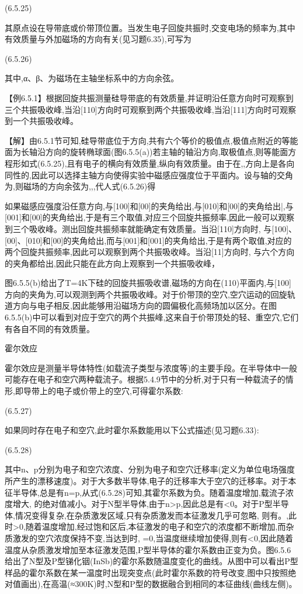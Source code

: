  	(6.5.25)

其原点设在导带底或价带顶位置。当发生电子回旋共振时,交变电场的频率为,其中有效质量与外加磁场的方向有关(见习题6.35),可写为

	 (6.5.26)

其中,α、β、为磁场在主轴坐标系中的方向余弦。

【例6.5.1】根据回旋共振测量硅导带底的有效质量,并证明沿任意方向时可观察到三个共振吸收峰,当沿[110]方向时可观察到两个共振吸收峰,当沿[111]方向时可观察到一个共振吸收峰。

【解】由6.5.1节可知,硅导带底位于方向,共有六个等价的极值点,极值点附近的等能面为长轴沿方向的旋转椭球面(图6.5.5(a))若主轴的轴沿方向,取极值点,则等能面方程形如式(6.5.25),且有电子的横向有效质量,纵向有效质量。由于在,,方向上是各向同性的,因此可以选择主轴方向使得实验中磁感应强度位于平面内。设与轴的交角为,则磁场的方向余弦为,,,代人式(6.5.26)得



如果磁感应强度沿任意方向,与[100]和[00]的夹角给出,与[010]和[00]的夹角给出|,与[001]和[00]的夹角给出,于是有三个取值,对应三个回旋共振频率,因此一般可以观察到三个吸收峰。测出回旋共振频率就能确定有效质量。当沿[110]方向时, 与[100]、[00]、[010]和[00]的夹角给出,而与[001]和[001]的夹角给出,于是有两个取值,对应的两个回旋共振频率,因此可以观察到两个共振吸收峰。当沿[11]方向时, 与六个方向的夹角都给出,因此只能在此方向上观察到一个共振吸收峰，



图6.5.5(b)给出了T=4K下硅的回旋共振吸收谱,磁场的方向在(110)平面内,与[100]方向的夹角为,可以观测到两个共振吸收峰。对于价带顶的空穴,空穴运动的回旋轨道方向与电子相反,因此能够用沿磁场方向的圆偏极化高频场加以区分。在图6.5.5(b)中可以看到对应于空穴的两个共振峰,这来自于价带顶处的轻、重空穴,它们有各自不同的有效质量。

霍尔效应

霍尔效应是测量半导体特性(如载流子类型与浓度等)的主要手段。在半导体中一般可能存在电子和空穴两种载流子。根据5.4.9节中的分析,对于只有一种载流子的情形,即导带上的电子或价带上的空穴,可得霍尔系数:

 	(6.5.27)

如果同时存在电子和空穴,此时霍尔系数能用以下公式描述(见习题6.33):

 	(6.5.28)

其中n、p分别为电子和空穴浓度、分别为电子和空穴迁移率(定义为单位电场强度所产生的漂移速度)。对于大多数半导体,电子的迁移率大于空穴的迁移率。对于本征半导体,总是有n=p,从式(6.5.28)可知,其霍尔系数为负。随着温度增加,载流子浓度增大, 的绝对值减小。对于N型半导体,由于n>p,因此总是有<0。对于P型半导体,情况变得复杂,在杂质激发区域,只有杂质激发而本征激发几乎可忽略, 则有。,此时>0,随着温度增加,经过饱和区后,本征激发的电子和空穴的浓度都不断增加,而杂质激发的空穴浓度保持不变,当达到时, =0,当温度继续增加使得,则有<0,因此随着温度从杂质激发增加至本征激发范围,P型半导体的霍尔系数由正变为负。图6.5.6给出了N型及P型锑化铟(InSb)的霍尔系数随温度变化的曲线。从图中可以看出P型样品的霍尔系数在某一温度时出现突变点(此时霍尔系数的符号改变,图中只按照绝对值画出),在高温(≈300K)时,N型和P型的数据融合到相同的本征曲线(曲线左侧)。



